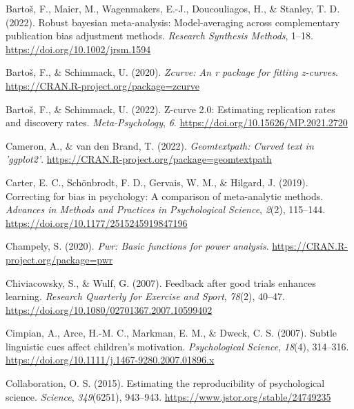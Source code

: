 \documentclass[
  man, donotrepeattitle,mask,floatsintext]{apa7}
\newlength{\cslhangindent}
\newlength{\cslentryspacingunit} %
\newenvironment{CSLReferences}[2] %
 {%
  \setlength{\parindent}{0pt}
  \ifodd #1
  \let\oldpar\par
  \def\par{\hangindent=\cslhangindent\oldpar}
  \fi
  \setlength{\parskip}{#2\cslentryspacingunit}
 }%
 {}
\begin{document}
\begin{CSLReferences}{1}{0}
\leavevmode{}%
Bartoš, F., Maier, M., Wagenmakers, E.-J., Doucouliagos, H., \& Stanley, T. D. (2022). Robust bayesian meta-analysis: Model-averaging across complementary publication bias adjustment methods. \emph{Research Synthesis Methods}, 1--18. \url{https://doi.org/10.1002/jrsm.1594}

\leavevmode{}%
Bartoš, F., \& Schimmack, U. (2020). \emph{Zcurve: An r package for fitting z-curves}. \url{https://CRAN.R-project.org/package=zcurve}

\leavevmode{}%
Bartoš, F., \& Schimmack, U. (2022). Z-curve 2.0: Estimating replication rates and discovery rates. \emph{Meta-Psychology}, \emph{6}. \url{https://doi.org/10.15626/MP.2021.2720}

\leavevmode{}%
Cameron, A., \& van den Brand, T. (2022). \emph{Geomtextpath: Curved text in 'ggplot2'}. \url{https://CRAN.R-project.org/package=geomtextpath}

\leavevmode{}%
Carter, E. C., Schönbrodt, F. D., Gervais, W. M., \& Hilgard, J. (2019). Correcting for bias in psychology: A comparison of meta-analytic methods. \emph{Advances in Methods and Practices in Psychological Science}, \emph{2}(2), 115--144. \url{https://doi.org/10.1177/2515245919847196}

\leavevmode{}%
Champely, S. (2020). \emph{Pwr: Basic functions for power analysis}. \url{https://CRAN.R-project.org/package=pwr}

\leavevmode{}%
Chiviacowsky, S., \& Wulf, G. (2007). Feedback after good trials enhances learning. \emph{Research Quarterly for Exercise and Sport}, \emph{78}(2), 40--47. \url{https://doi.org/10.1080/02701367.2007.10599402}

\leavevmode{}%
Cimpian, A., Arce, H.-M. C., Markman, E. M., \& Dweck, C. S. (2007). Subtle linguistic cues affect children's motivation. \emph{Psychological Science}, \emph{18}(4), 314--316. \url{https://doi.org/10.1111/j.1467-9280.2007.01896.x}

\leavevmode{}%
Collaboration, O. S. (2015). Estimating the reproducibility of psychological science. \emph{Science}, \emph{349}(6251), 943--943. \url{https://www.jstor.org/stable/24749235}


\end{CSLReferences}
\end{document}

